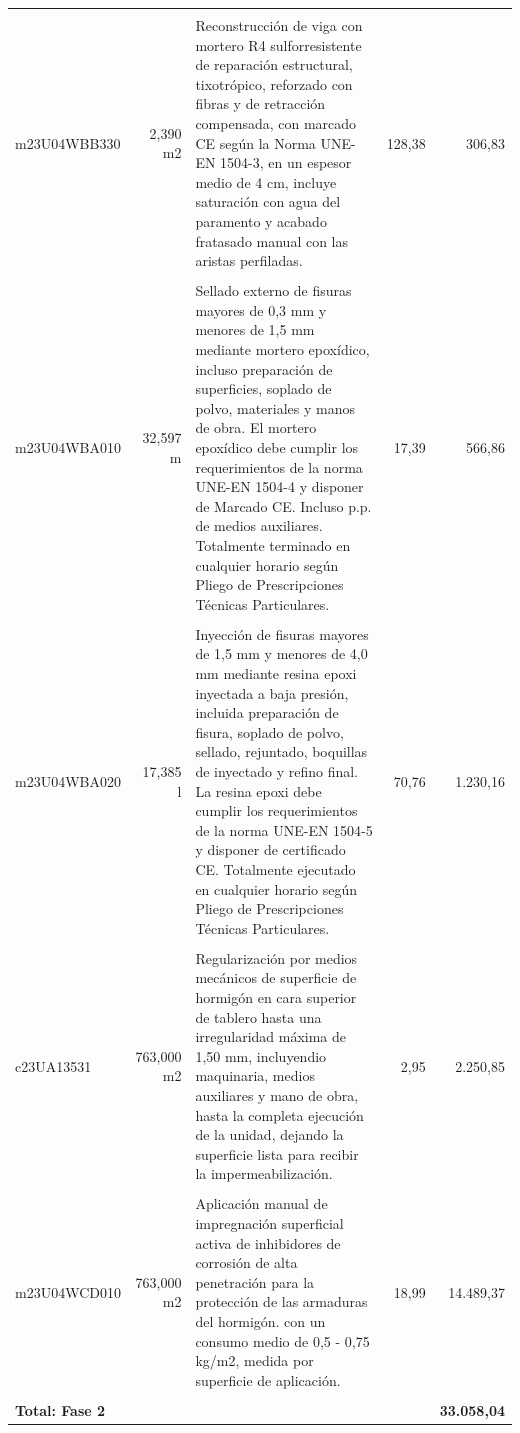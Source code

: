 \documentclass{book}%
\begin{document}
\begin{longtable}{lrlrr}
&&&&\\%
m23U04WBB330&     2,390 m2&\multicolumn{1}{p{5cm}}{Reconstrucción de viga con mortero R4 sulforresistente de reparación estructural, tixotrópico, reforzado con fibras y de retracción compensada, con marcado CE según la Norma UNE{-}EN 1504{-}3, en un espesor medio de 4 cm, incluye saturación con agua del paramento y acabado fratasado manual con las aristas perfiladas.}&    128,38&306,83\\%
&&&&\\%
m23U04WBA010&    32,597 m&\multicolumn{1}{p{5cm}}{Sellado externo de fisuras mayores de 0,3 mm y menores de 1,5 mm mediante mortero epoxídico, incluso preparación de superficies, soplado de polvo, materiales y manos de obra. El mortero epoxídico debe cumplir los requerimientos de la norma UNE{-}EN 1504{-}4 y disponer de Marcado CE. Incluso p.p. de medios auxiliares. Totalmente terminado en cualquier horario según Pliego de Prescripciones Técnicas Particulares.}&     17,39&566,86\\%
&&&&\\%
m23U04WBA020&    17,385 l&\multicolumn{1}{p{5cm}}{Inyección de fisuras mayores de 1,5 mm y menores de 4,0 mm mediante resina epoxi inyectada a baja presión, incluida preparación de fisura, soplado de polvo, sellado, rejuntado, boquillas de inyectado y refino final. La resina epoxi debe cumplir los requerimientos de la norma UNE{-}EN 1504{-}5 y disponer de certificado CE. Totalmente ejecutado en cualquier horario según Pliego de Prescripciones Técnicas Particulares.}&     70,76&1.230,16\\%
&&&&\\%
c23UA13531&   763,000 m2&\multicolumn{1}{p{5cm}}{Regularización por medios mecánicos de superficie de hormigón en cara superior de tablero hasta una irregularidad máxima de 1,50 mm, incluyendio maquinaria, medios auxiliares y mano de obra, hasta la completa ejecución de la unidad, dejando la superficie lista para recibir la impermeabilización.}&      2,95&2.250,85\\%
&&&&\\%
m23U04WCD010&   763,000 m2&\multicolumn{1}{p{5cm}}{Aplicación manual de impregnación superficial activa de inhibidores de corrosión de alta penetración para la protección de las armaduras del hormigón. con un consumo medio de 0,5 {-} 0,75 kg/m2, medida por superficie de aplicación.}&     18,99&14.489,37\\%
&&&&\\%
\multicolumn{4}{p{8cm}}{\textbf{Total: Fase 2}}&\textbf{33.058,04}\\%
\end{longtable}%
\normalsize
\end{document}
